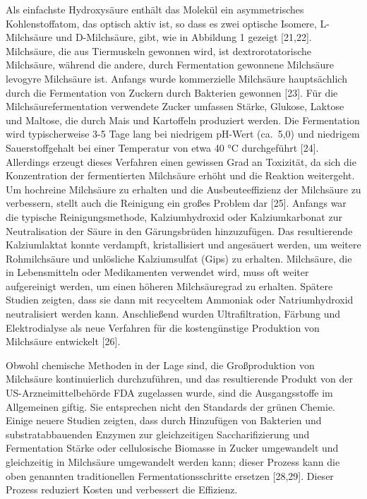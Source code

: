 \documentclass[10pt]{article}
\begin{document}
    Als einfachste Hydroxysäure enthält das Molekül ein asymmetrisches Kohlenstoffatom, das optisch aktiv ist, so dass es zwei optische Isomere, L-Milchsäure und D-Milchsäure, gibt, wie in Abbildung 1 gezeigt [21,22].
    Milchsäure, die aus Tiermuskeln gewonnen wird, ist dextrorotatorische Milchsäure, während die andere, durch Fermentation gewonnene Milchsäure levogyre Milchsäure ist.
    Anfangs wurde kommerzielle Milchsäure hauptsächlich durch die Fermentation von Zuckern durch Bakterien gewonnen [23].
    Für die Milchsäurefermentation verwendete Zucker umfassen Stärke, Glukose, Laktose und Maltose, die durch Mais und Kartoffeln produziert werden.
    Die Fermentation wird typischerweise 3-5 Tage lang bei niedrigem pH-Wert (ca.\ 5,0) und niedrigem Sauerstoffgehalt bei einer Temperatur von etwa 40 °C durchgeführt [24].
    Allerdings erzeugt dieses Verfahren einen gewissen Grad an Toxizität, da sich die Konzentration der fermentierten Milchsäure erhöht und die Reaktion weitergeht.
    Um hochreine Milchsäure zu erhalten und die Ausbeuteeffizienz der Milchsäure zu verbessern, stellt auch die Reinigung ein großes Problem dar [25].
    Anfangs war die typische Reinigungsmethode, Kalziumhydroxid oder Kalziumkarbonat zur Neutralisation der Säure in den Gärungsbrüden hinzuzufügen.
    Das resultierende Kalziumlaktat konnte verdampft, kristallisiert und angesäuert werden, um weitere Rohmilchsäure und unlösliche Kalziumsulfat (Gips) zu erhalten.
    Milchsäure, die in Lebensmitteln oder Medikamenten verwendet wird, muss oft weiter aufgereinigt werden, um einen höheren Milchsäuregrad zu erhalten.
    Spätere Studien zeigten, dass sie dann mit recyceltem Ammoniak oder Natriumhydroxid neutralisiert werden kann.
    Anschließend wurden Ultrafiltration, Färbung und Elektrodialyse als neue Verfahren für die kostengünstige Produktion von Milchsäure entwickelt [26].

    Obwohl chemische Methoden in der Lage sind, die Großproduktion von Milchsäure kontinuierlich durchzuführen, und das resultierende Produkt von der US-Arzneimittelbehörde FDA zugelassen wurde, sind die Ausgangsstoffe im Allgemeinen giftig.
    Sie entsprechen nicht den Standards der grünen Chemie.
    Einige neuere Studien zeigten, dass durch Hinzufügen von Bakterien und substratabbauenden Enzymen zur gleichzeitigen Saccharifizierung und Fermentation Stärke oder cellulosische Biomasse in Zucker umgewandelt und gleichzeitig in Milchsäure umgewandelt werden kann; dieser Prozess kann die oben genannten traditionellen Fermentationsschritte ersetzen [28,29].
    Dieser Prozess reduziert Kosten und verbessert die Effizienz.
\end{document}
